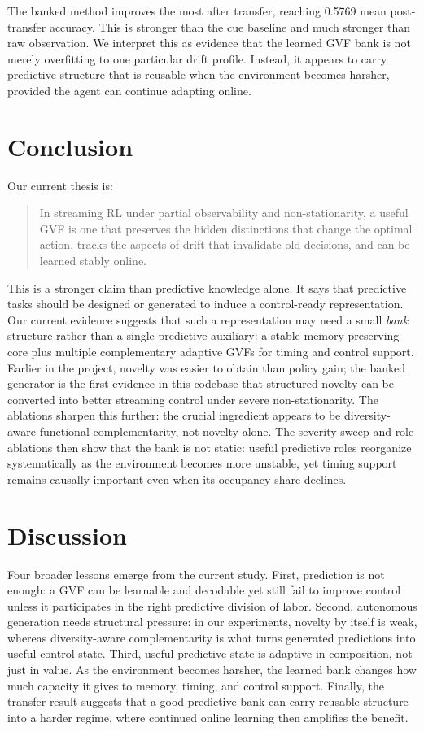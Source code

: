 \documentclass[11pt]{article}
\begin{document}
The banked method improves the most after transfer, reaching 0.5769 mean post-transfer accuracy. This is stronger than the cue baseline and much stronger than raw observation. We interpret this as evidence that the learned GVF bank is not merely overfitting to one particular drift profile. Instead, it appears to carry predictive structure that is reusable when the environment becomes harsher, provided the agent can continue adapting online.

\section{Conclusion}
Our current thesis is:
\begin{quote}
In streaming RL under partial observability and non-stationarity, a useful GVF is one that preserves the hidden distinctions that change the optimal action, tracks the aspects of drift that invalidate old decisions, and can be learned stably online.
\end{quote}

This is a stronger claim than predictive knowledge alone. It says that predictive tasks should be designed or generated to induce a control-ready representation. Our current evidence suggests that such a representation may need a small \emph{bank} structure rather than a single predictive auxiliary: a stable memory-preserving core plus multiple complementary adaptive GVFs for timing and control support. Earlier in the project, novelty was easier to obtain than policy gain; the banked generator is the first evidence in this codebase that structured novelty can be converted into better streaming control under severe non-stationarity. The ablations sharpen this further: the crucial ingredient appears to be diversity-aware functional complementarity, not novelty alone. The severity sweep and role ablations then show that the bank is not static: useful predictive roles reorganize systematically as the environment becomes more unstable, yet timing support remains causally important even when its occupancy share declines.

\section{Discussion}
Four broader lessons emerge from the current study. First, prediction is not enough: a GVF can be learnable and decodable yet still fail to improve control unless it participates in the right predictive division of labor. Second, autonomous generation needs structural pressure: in our experiments, novelty by itself is weak, whereas diversity-aware complementarity is what turns generated predictions into useful control state. Third, useful predictive state is adaptive in composition, not just in value. As the environment becomes harsher, the learned bank changes how much capacity it gives to memory, timing, and control support. Finally, the transfer result suggests that a good predictive bank can carry reusable structure into a harder regime, where continued online learning then amplifies the benefit.
\end{document}
